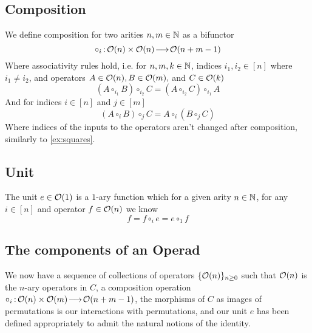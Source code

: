 \subsection{Composition}
We define composition for two arities \( n, m \in \mathbb{N} \) as a bifunctor
\[ \circ_i \,{:}\,\mathcal{O}(n) \times \mathcal{O}(n)\!\longrightarrow\!\mathcal{O}(n + m - 1) \]
Where associativity rules hold, i.e. for \( n, m, k \in \mathbb{N} \), indices \( i_1, i_2 \in [n] \) where \( i_1 \neq i_2 \), and operators \( A \in \mathcal{O}(n), B \in \mathcal{O}(m), \) and \( C \in \mathcal{O}(k) \)
\[ (A \circ_{i_1} B) \circ_{i_2} C = (A \circ_{i_2} C) \circ_{i_1} A \]
And for indices \( i \in [n] \) and \( j \in [m] \)
\[ (A \circ_i B) \circ_j C = A \circ_i (B \circ_j C) \]
Where indices of the inputs to the operators aren't changed after composition, similarly to \cref{ex:squares}.

\subsection{Unit}
The unit \( e \in \mathcal{O}(1) \) is a \( 1 \)-ary function which for a given arity \( n \in \mathbb{N}\), for any \( i \in [n] \) and operator \( f \in \mathcal{O}(n) \) we know
\[ f =  f \circ_i e = e \circ_1 f \]

\subsection{The components of an Operad}
We now have a sequence of collections of operators \( \{ \mathcal{O}(n) \}_{n \ge 0} \) such that \( \mathcal{O}(n) \) is the \( n \)-ary operators in \( C \), a composition operation \( \circ_i \,{:}\,\mathcal{O}(n) \times \mathcal{O}(m)\!\longrightarrow\!\mathcal{O}(n + m - 1) \), the morphisms of \( C \) as images of permutations is our interactions with permutations, and our unit \( e \) has been defined appropriately to admit the natural notions of the identity.



